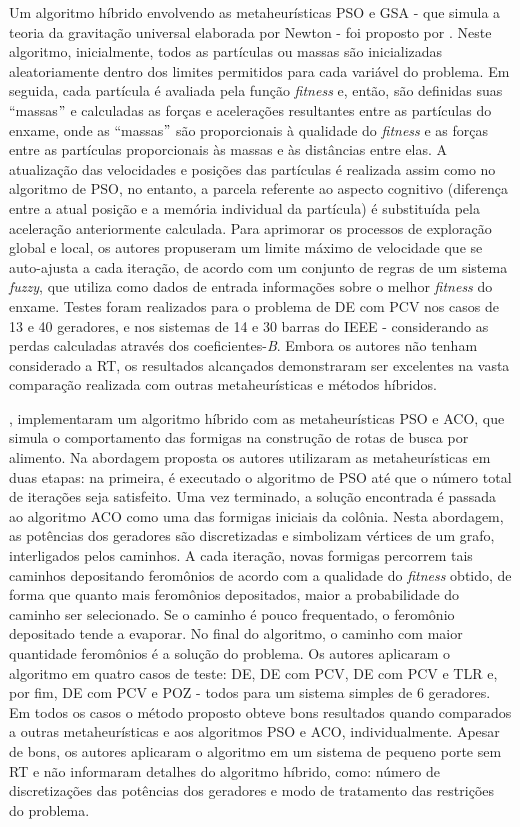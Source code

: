\documentclass[
	12pt,				%
	openany,			%
	twoside,			%
	a4paper,			%
	chapter=TITLE,		%
	section=Title,		%
	subsection=Title,	%
	subsubsection=Title,%
	english,			%
	french,				%
	spanish,			%
	brazil			%
	]{abntex2}
\begin{document}
\begin{ERRATA}
Um algoritmo híbrido envolvendo as metaheurísticas PSO e GSA - que simula a teoria da gravitação universal elaborada por Newton - foi proposto por . Neste algoritmo, inicialmente, todos as partículas ou massas são inicializadas aleatoriamente dentro dos limites permitidos para cada variável do problema. Em seguida, cada partícula é avaliada pela função \emph{fitness} e, então, são definidas suas ``massas$"$ e calculadas as forças e acelerações resultantes entre as partículas do enxame, onde as ``massas$"$ são proporcionais à qualidade do \emph{fitness} e as forças entre as partículas proporcionais às massas e às distâncias entre elas. A atualização das velocidades e posições das partículas é realizada assim como no algoritmo de PSO, no entanto, a parcela referente ao aspecto cognitivo (diferença entre a atual posição e a memória individual da partícula) é substituída pela aceleração anteriormente calculada. Para aprimorar os processos de exploração global e local, os autores propuseram um limite máximo de velocidade que se auto-ajusta a cada iteração, de acordo com um conjunto de regras de um sistema \emph{fuzzy}, que utiliza como dados de entrada informações sobre o melhor \emph{fitness} do enxame. Testes foram realizados para o problema de DE com PCV nos casos de 13 e 40 geradores, e nos sistemas de 14 e 30 barras do IEEE - considerando as perdas calculadas através dos coeficientes-\emph{B}. Embora os autores não tenham considerado a RT, os resultados alcançados demonstraram ser excelentes na vasta comparação realizada com outras metaheurísticas e métodos híbridos. 

, implementaram um algoritmo híbrido com as metaheurísticas PSO e ACO, que simula o comportamento das formigas na construção de rotas de busca por alimento. Na abordagem proposta os autores utilizaram as metaheurísticas em duas etapas: na primeira, é executado o algoritmo de PSO até que o número total de iterações seja satisfeito. Uma vez terminado, a solução encontrada é passada ao algoritmo ACO como uma das formigas iniciais da colônia. Nesta abordagem, as potências dos geradores são discretizadas e simbolizam vértices de um grafo, interligados pelos caminhos. A cada iteração, novas formigas percorrem tais caminhos depositando feromônios de acordo com a qualidade do \emph{fitness} obtido, de forma que quanto mais feromônios depositados, maior a probabilidade do caminho ser selecionado. Se o caminho é pouco frequentado, o feromônio depositado tende a evaporar. No final do algoritmo, o caminho com maior quantidade feromônios é a solução do problema. Os autores aplicaram o algoritmo em quatro casos de teste: DE, DE com PCV, DE com PCV e TLR e, por fim, DE com PCV e POZ - todos para um sistema simples de 6 geradores. Em todos os casos o método proposto obteve bons resultados quando comparados a outras metaheurísticas e aos algoritmos PSO e ACO, individualmente. Apesar de bons, os autores aplicaram o algoritmo em um sistema de pequeno porte sem RT e não informaram detalhes do algoritmo híbrido, como: número de discretizações das potências dos geradores e modo de tratamento das restrições do problema.



\end{ERRATA}
\end{document}
